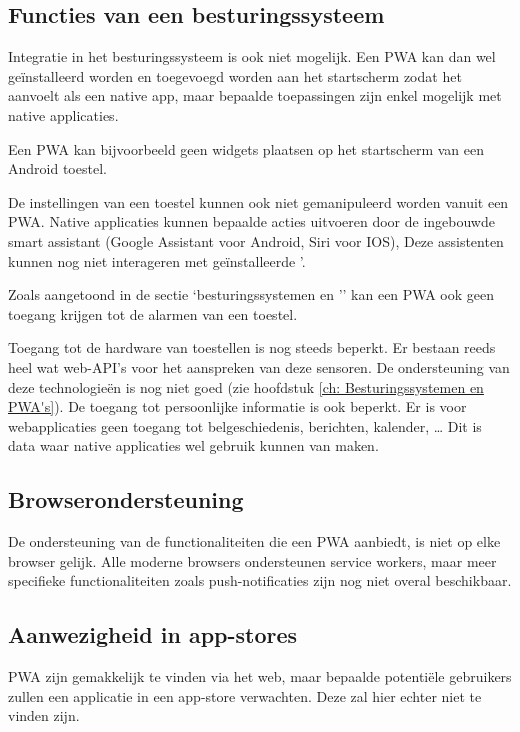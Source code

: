 	
\subsection{Functies van een besturingssysteem}

	Integratie in het besturingssysteem is ook niet mogelijk. Een PWA kan dan wel geïnstalleerd worden en toegevoegd worden aan het startscherm zodat het aanvoelt als een native app, maar bepaalde toepassingen zijn enkel mogelijk met native applicaties.
	
	Een PWA kan bijvoorbeeld geen widgets plaatsen op het startscherm van een Android toestel. 
	
	De instellingen van een toestel kunnen ook niet gemanipuleerd worden vanuit een PWA. Native applicaties kunnen bepaalde acties uitvoeren door de ingebouwde smart assistant (Google Assistant voor Android, Siri voor IOS), Deze assistenten kunnen nog niet interageren met geïnstalleerde '.
	
	Zoals aangetoond in de sectie ‘besturingssystemen en '’ kan een PWA ook geen toegang krijgen tot de alarmen van een toestel.
	
	Toegang tot de hardware van toestellen is nog steeds beperkt. Er bestaan reeds heel wat web-API’s voor het aanspreken van deze sensoren. De ondersteuning van deze technologieën is nog niet goed (zie hoofdstuk \ref{ch: Besturingssystemen en PWA's}).
	De toegang tot persoonlijke informatie is ook beperkt. Er is voor webapplicaties geen toegang tot belgeschiedenis, berichten, kalender, … Dit is data waar native applicaties wel gebruik kunnen van maken.
	\autocite{Brousek2017}
	
\subsection{Browserondersteuning}

	De ondersteuning van de functionaliteiten die een PWA aanbiedt, is niet op elke browser gelijk. Alle moderne browsers ondersteunen service workers, maar meer specifieke functionaliteiten zoals push-notificaties zijn nog niet overal beschikbaar.
	
	
\subsection{Aanwezigheid in app-stores}
	PWA zijn gemakkelijk te vinden via het web, maar bepaalde potentiële gebruikers zullen een applicatie in een app-store verwachten. Deze zal hier echter niet te vinden zijn.
	
